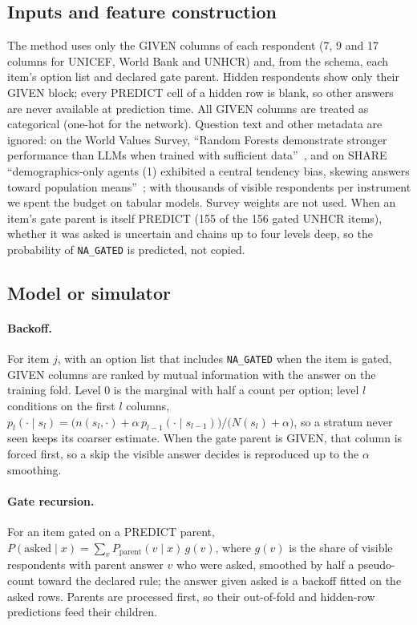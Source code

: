 \documentclass{article}
\begin{document}
\subsection{Inputs and feature construction}
The method uses only the GIVEN columns of each respondent (7, 9 and 17 columns
for UNICEF, World Bank and UNHCR) and, from the schema, each item's option list
and declared gate parent. Hidden respondents show only their GIVEN block; every
PREDICT cell of a hidden row is blank, so other answers are never available at
prediction time. All GIVEN columns are treated as categorical (one-hot for the
network). Question text and other metadata are ignored: on the World Values
Survey, ``Random Forests demonstrate stronger performance than LLMs when trained
with sufficient data''~\citep{sinacola2025llms}, and on SHARE
``demographics-only agents (1) exhibited a central tendency bias, skewing
answers toward population means''~\citep{garzon2026demographics}; with thousands
of visible respondents per instrument we spent the budget on tabular models.
Survey weights are not used. When an item's gate parent is itself PREDICT (155
of the 156 gated UNHCR items), whether it was asked is uncertain and chains up
to four levels deep, so the probability of \texttt{NA\_GATED} is predicted, not
copied.

\subsection{Model or simulator}
\paragraph{Backoff.} For item $j$, with an option list that includes
\texttt{NA\_GATED} when the item is gated, GIVEN columns are ranked by mutual
information with the answer on the training fold. Level $0$ is the marginal
with half a count per option; level $l$ conditions on the first $l$ columns,
$p_l(\cdot\mid s_l)=\bigl(n(s_l,\cdot)+\alpha\,p_{l-1}(\cdot\mid s_{l-1})\bigr)/\bigl(N(s_l)+\alpha\bigr)$,
so a stratum never seen keeps its coarser estimate. When the gate parent is
GIVEN, that column is forced first, so a skip the visible answer decides is
reproduced up to the $\alpha$ smoothing.

\paragraph{Gate recursion.} For an item gated on a PREDICT parent,
$P(\text{asked}\mid x)=\sum_v P_{\text{parent}}(v\mid x)\,g(v)$, where $g(v)$ is
the share of visible respondents with parent answer $v$ who were asked, smoothed
by half a pseudo-count toward the declared rule; the answer given asked is a
backoff fitted on the asked rows. Parents are processed first, so their
out-of-fold and hidden-row predictions feed their children.
\end{document}
